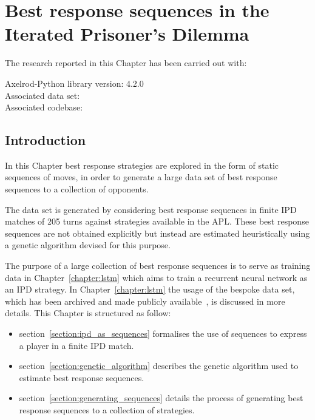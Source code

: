 \chapter{Best response sequences in the Iterated Prisoner's Dilemma}\label{chapter:best_response_sequence}

\begin{center}
    The research reported in this Chapter has been carried out with:

    Axelrod-Python library version: 4.2.0 \\
    Associated data set: \cite{Glynatsi2020_sequences} \\
    Associated codebase: \cite{Glynatsi_2020_sensei} \\ \vspace{.5cm}
\end{center}

\hrulefill

\section{Introduction}

In this Chapter best response strategies are explored in the form
of static sequences of moves, in order to generate a large data set of best
response sequences to a collection of opponents.

The data set is generated by considering best response sequences in finite IPD
matches of 205 turns against \numberofstrategiesbestsequences strategies
available in the APL. These best response sequences are not obtained explicitly
but instead are estimated heuristically using a genetic algorithm devised for
this purpose.

The purpose of a large collection of best response sequences is
to serve as training data in Chapter~\ref{chapter:lstm} which aims to train a
recurrent neural network as an IPD strategy. In Chapter~\ref{chapter:lstm} the
usage of the bespoke data set, which has been archived and made publicly
available~\cite{Glynatsi2020_sequences}, is discussed in more details. This
Chapter is structured as follow:

\begin{itemize}
    \item section~\ref{section:ipd_as_sequences} formalises the use of sequences to express a player in a
    finite IPD match.
    \item section~\ref{section:genetic_algorithm} describes the genetic algorithm
    used to estimate best response
    sequences.
    \item section~\ref{section:generating_sequences} details the process of
    generating best response sequences to a collection of
    \numberofstrategiesbestsequences strategies.
\end{itemize}

